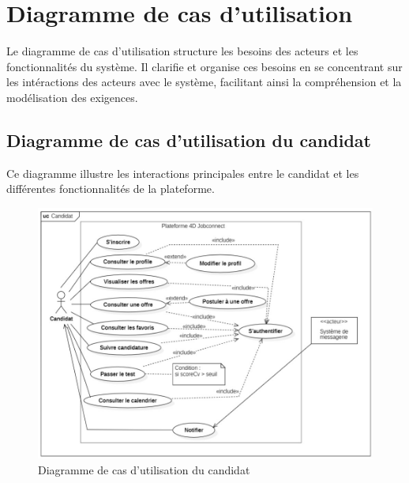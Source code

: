 \section{Diagramme de cas d’utilisation}

Le diagramme de cas d'utilisation structure les besoins des acteurs 
et les fonctionnalités du système. Il clarifie et organise 
ces besoins en se concentrant sur les intéractions des acteurs avec 
le système, facilitant ainsi la compréhension et la modélisation 
des exigences.
\subsection{Diagramme de cas d’utilisation du candidat}
Ce diagramme illustre les interactions principales entre le 
candidat et les différentes fonctionnalités de la plateforme. 

\begin{figure}[h]
    \centering
    \includegraphics[scale=1]{Images/Candidat1.jpg} %
    \caption{Diagramme de cas d’utilisation du candidat}
    \label{fig:UCCandidat}
\end{figure}
\vspace{8cm}

